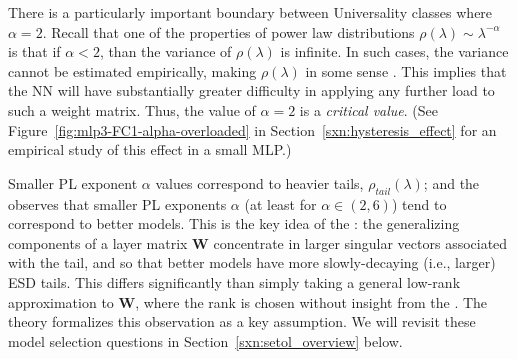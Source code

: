 There is a particularly important boundary between Universality classes where $\alpha = 2$. Recall that one of the 
properties of power law distributions $\rho(\lambda)\sim \lambda^{-\alpha}$ is that if $\alpha<2$, than the variance of 
$\rho(\lambda)$ is infinite. In such cases, the variance cannot be estimated empirically, making $\rho(\lambda)$ in 
some sense \emph{\ATypical}. This implies that the NN will have substantially greater difficulty in applying any further 
load to such a weight matrix. Thus, the value of $\alpha = 2$ is a \emph{critical value}. (See 
Figure~\ref{fig:mlp3-FC1-alpha-overloaded} in Section~\ref{sxn:hysteresis_effect} for an empirical study of this effect 
in a small MLP.)

Smaller PL exponent $\alpha$ values correspond to heavier tails, $\rho_{tail}(\lambda)$; and
the \HTSR \Phenomenology observes that smaller PL exponents $\alpha$ (at least for $\alpha\in(2,6)$) tend to correspond to better models.
This is the key idea of the \HTSR:
the generalizing components of a layer matrix $\mathbf{W}$ concentrate in larger singular vectors associated with the tail, and 
so that better models have more slowly-decaying (i.e., larger) ESD tails.
This differs significantly than simply taking a general low-rank approximation to $\mathbf{W}$, where the rank
is chosen without insight from the \HTSR \Phenomenology. 
The \SETOL theory formalizes this observation as a key assumption. We will revisit these model selection questions in 
Section~\ref{sxn:setol_overview} below.


